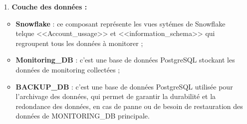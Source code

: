     \begin{enumerate}

        \item[1.] \textbf{Couche des données :} 
                \begin{itemize}
                \item \textbf{Snowflake} : ce composant représente les vues sytémes de Snowflake telque <<Account\_ussage>> et <<information\_schema>> qui regroupent tous les données à monitorer ;
                \item \textbf{Monitoring\_DB} : c'est une base de données PostgreSQL stockant les données de monitoring collectées ;
                \item \textbf{BACKUP\_DB} : c'est une base de données PostgreSQL utilisée pour l'archivage des données, qui permet de garantir la durabilité et la redondance des données, en cas de panne ou de besoin de restauration des données de MONITORING\_DB principale.

            \end{itemize}
            

\end{enumerate}
